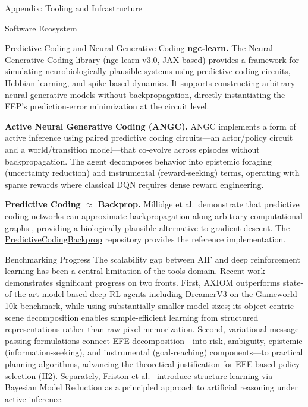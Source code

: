 \documentclass[
  ignorenonframetext,
]{beamer}
\begin{document}
\begin{frame}[fragile]{Appendix: Tooling and Infrastructure
\label{sec:tooling}}
\begin{block}{Software Ecosystem}
\begin{block}{Predictive Coding and Neural Generative Coding}
\textbf{ngc-learn.} The Neural Generative Coding library (ngc-learn
v3.0, JAX-based) provides a framework for simulating
neurobiologically-plausible systems using predictive coding circuits,
Hebbian learning, and spike-based dynamics. It supports constructing
arbitrary neural generative models without backpropagation, directly
instantiating the FEP's prediction-error minimization at the circuit
level.

\textbf{Active Neural Generative Coding (ANGC).} ANGC implements a form
of active inference using paired predictive coding circuits---an
actor/policy circuit and a world/transition model---that co-evolve
across episodes without backpropagation. The agent decomposes behavior
into epistemic foraging (uncertainty reduction) and instrumental
(reward-seeking) terms, operating with sparse rewards where classical
DQN requires dense reward engineering.

\textbf{Predictive Coding \(\approx\) Backprop.} Millidge et
al.~demonstrate that predictive coding networks can approximate
backpropagation along arbitrary computational graphs
\citep{millidge2022predictive}, providing a biologically plausible
alternative to gradient descent. The
\href{https://github.com/BerenMillidge/PredictiveCodingBackprop}{PredictiveCodingBackprop}
repository provides the reference implementation.
\end{block}

\begin{block}{Benchmarking Progress}
\protect{}\label{benchmarking-progress}
The scalability gap between AIF and deep reinforcement learning has been
a central limitation of the tools domain. Recent work demonstrates
significant progress on two fronts. First, AXIOM \citep{heins2025axiom}
outperforms state-of-the-art model-based deep RL agents including
DreamerV3 on the Gameworld 10k benchmark, while using substantially
smaller model sizes; its object-centric scene decomposition enables
sample-efficient learning from structured representations rather than
raw pixel memorization. Second, variational message passing formulations
\citep{champion2021realizing} connect EFE decomposition---into risk,
ambiguity, epistemic (information-seeking), and instrumental
(goal-reaching) components---to practical planning algorithms, advancing
the theoretical justification for EFE-based policy selection (H2).
Separately, Friston et al.~\citep{friston2025active} introduce structure
learning via Bayesian Model Reduction as a principled approach to
artificial reasoning under active inference.
\end{block}


\end{block}
\end{frame}
\end{document}

